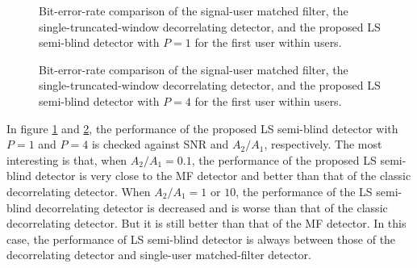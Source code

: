 \documentclass[a4paper,11pt,fleqn]{article}
\begin{document}
\begin{figure}
\caption{Bit-error-rate comparison of the signal-user matched
filter, the single-truncated-window decorrelating detector, and
the proposed LS semi-blind detector with $P=1$ for the first user
within users.} \label{LS11}
\end{figure}

\begin{figure}
\caption{Bit-error-rate comparison of the signal-user matched
filter, the single-truncated-window decorrelating detector, and
the proposed LS semi-blind detector with $P=4$ for the first user
within users.} \label{LS41}
\end{figure}

In figure \ref{LS11} and \ref{LS41}, the performance of the
proposed LS semi-blind detector with $P=1$ and $P=4$ is checked
against SNR and $A_2/A_1$, respectively. The most interesting is
that, when $A_2/A_1=0.1$, the performance of the proposed LS
semi-blind detector is very close to the MF detector and better
than that of the classic decorrelating detector. When $A_2/A_1=1$
or $10$, the performance of the LS semi-blind decorrelating
detector is decreased and is worse than that of the classic
decorrelating detector. But it is still better than that of the MF
detector. In this case, the performance of LS semi-blind detector
is always between those of the decorrelating detector and
single-user matched-filter detector.
\end{document}

